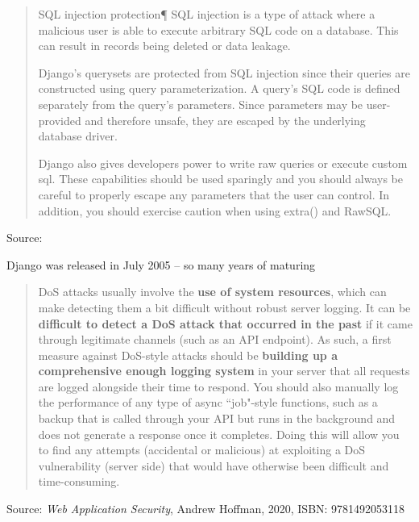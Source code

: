 \documentclass[Screen16to9,17pt]{foils}
\begin{document}
\begin{quote}
SQL injection protection¶
SQL injection is a type of attack where a malicious user is able to execute arbitrary SQL code on a database. This can result in records being deleted or data leakage.

Django’s querysets are protected from SQL injection since their queries are constructed using query parameterization. A query’s SQL code is defined separately from the query’s parameters. Since parameters may be user-provided and therefore unsafe, they are escaped by the underlying database driver.

Django also gives developers power to write raw queries or execute custom sql. These capabilities should be used sparingly and you should always be careful to properly escape any parameters that the user can control. In addition, you should exercise caution when using extra() and RawSQL.
\end{quote}
Source: 

\begin{list2}
\item Django was released in July 2005 -- so many years of maturing
\end{list2}









\begin{quote}
DoS attacks usually involve the {\bf use of system resources}, which can make detecting
them a bit difficult without robust server logging. It can be {\bf difficult to detect a DoS
attack that occurred in the past} if it came through legitimate channels (such as an API
endpoint).
As such, a first measure against DoS-style attacks should be {\bf building up a comprehensive enough logging system} in your server that all requests are logged alongside their time to respond. You should also manually log the performance of any type of async “job"-style functions, such as a backup that is called through your API but runs in the background and does not generate a response once it completes. Doing this will allow you to find any attempts (accidental or malicious) at exploiting a DoS vulnerability (server side) that would have otherwise been difficult and time-consuming.
\end{quote}
Source: \emph{Web Application Security}, Andrew Hoffman, 2020, ISBN: 9781492053118
\end{document}
